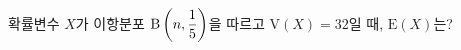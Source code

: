 확률변수 $X$가 이항분포 $\mathrm{B}\left(n{,}\mkern3mu\mathopen{}\dfrac{1}{5}\right)$을 따르고 $\mathrm{V}(X)=32$일 때, $\mathrm{E}(X)$는?
